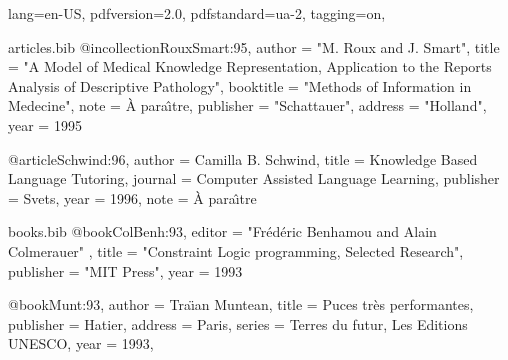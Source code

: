 \DocumentMetadata
  {
    lang=en-US,
    pdfversion=2.0,
    pdfstandard=ua-2,
    tagging=on,
  }
\begin{filecontents}{articles.bib}
@incollection{RouxSmart:95,
    author    = "M. Roux and J. Smart",
    title     = "A Model of Medical Knowledge Representation, Application
                 to the Reports Analysis of Descriptive Pathology",
    booktitle = "Methods of Information in Medecine",
    note      = {\`A para\^{\i}tre},
    publisher = "Schattauer",
    address   = "Holland",
    year      = 1995
}

@article{Schwind:96,
    author    = {Camilla B. Schwind},
    title     = {Knowledge Based Language Tutoring},
    journal   = {Computer Assisted Language Learning},
    publisher = {Svets},
    year      = 1996,
    note      = {\`A para\^{\i}tre}
}
\end{filecontents}
\begin{filecontents}{books.bib}
@book{ColBenh:93,
   editor = "Fr\'ed\'eric Benhamou and Alain Colmerauer" ,
   title = "Constraint Logic programming, Selected Research",
   publisher = "MIT Press",
   year = 1993
}

@book{Munt:93,
   author =    {Tra{\"\i}an Muntean},
   title =     {Puces tr\`es performantes},
   publisher = {Hatier},
   address =   {Paris},
   series = {Terres du futur, Les Editions UNESCO},
   year =      1993,
}
\end{filecontents}

\documentclass[10pt]{article}
\usepackage{bibtopic}
\usepackage{hyperref}



\section{Testing}
Let's cite all the books: \cite{ColBenh:93} and
\cite{Munt:93}; and an article: \cite{RouxSmart:95}.

\begin{btSect}{books}
\section{References from books}
\btPrintCited
\end{btSect}

\begin{btSect}[plain]{articles}
\section{References from articles}
\btPrintCited

\section{Articles not cited}
\btPrintNotCited
\end{btSect}
